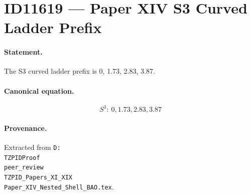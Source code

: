 \section*{ID11619 --- Paper XIV S3 Curved Ladder Prefix}

\paragraph{Statement.}
The S3 curved ladder prefix is 0, 1.73, 2.83, 3.87.

\paragraph{Canonical equation.}
\[
S^3:\ 0,1.73,2.83,3.87
\]

\paragraph{Provenance.}
Extracted from \texttt{D:\\TZPIDProof\\peer\_review\\TZPID\_Papers\_XI\_XIX\\Paper\_XIV\_Nested\_Shell\_BAO.tex}.
